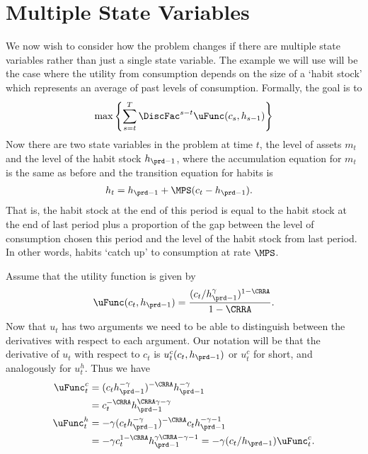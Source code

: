 \documentclass[\econtexRoot/SolvingMicroDSOPs]{subfiles}
\begin{document}
\hypertarget{Multiple-State-Variables}{}
\section{Multiple State Variables}
We now wish to consider how the problem changes if there are multiple
state variables rather than just a single state variable.  The example
we will use will be the case where the utility from consumption
depends on the size of a `habit stock' which represents an average of
past levels of consumption.  Formally, the goal is to
\begin{equation}
  \max \left\{ \sum_{s=t}^T \DiscFac^{s-t} \uFunc(c_{s},h_{s-1}) \right\}
\end{equation}
Now there are two state variables in the problem at time $t$, the
level of assets $m_{t}$ and the level of the habit stock $h_{\prd-1}$,
where the accumulation equation for $m_{t}$ is the same as before and
the transition equation for habits is
\begin{equation}\begin{gathered}\begin{aligned}
  h_{t}  & = h_{\prd-1} + \MPS(c_{t}-h_{\prd-1}).
\end{aligned}\end{gathered}\end{equation}
That is, the habit stock at the end of this period is equal to the
habit stock at the end of last period plus a proportion of the gap
between the level of consumption chosen this period and the level of
the habit stock from last period.  In other words, habits `catch up'
to consumption at rate $\MPS$.

Assume that the utility function is given by
\begin{equation}
  \uFunc(c_{t},h_{\prd-1}) = \frac{(c_{t}/h_{\prd-1}^{\gamma})^{1-\CRRA}}{1-\CRRA}.
\end{equation}
Now that $u_{t}$ has two arguments we need to be able to distinguish
between the derivatives with respect to each argument.  Our notation
will be that the derivative of $u_{t}$ with respect to $c_{t}$ is
$u_{t}^{c}(c_{t},h_{\prd-1})$ or $u_{t}^{c}$ for short, and analogously
for $u_{t}^{h}$.  Thus we have
\begin{equation}\begin{gathered}\begin{aligned}
  \uFunc^{c}_{t}  & = (c_{t} h_{\prd-1}^{-\gamma})^{-\CRRA}h_{\prd-1}^{-\gamma}  \\
                  & = c_{t}^{-\CRRA}h_{\prd-1}^{\CRRA\gamma-\gamma}  \\
  \uFunc^{h}_{t}  & = -\gamma (c_{t} h_{\prd-1}^{-\gamma})^{-\CRRA} c_{t} h_{\prd-1}^{-\gamma-1} \\
                  & = -\gamma c_{t}^{1-\CRRA}h_{\prd-1}^{\gamma\CRRA - \gamma -
                    1} = -\gamma (c_{t}/h_{\prd-1}) \uFunc^{c}_{t}.
\end{aligned}\end{gathered}\end{equation}
\end{document}
